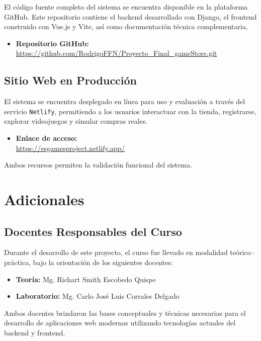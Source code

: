 \documentclass{article}
\begin{document}
El código fuente completo del sistema se encuentra disponible en la plataforma GitHub. Este repositorio contiene el backend desarrollado con Django, el frontend construido con Vue.js y Vite, así como documentación técnica complementaria.

\begin{itemize}
    \item \textbf{Repositorio GitHub:} \\
    \url{https://github.com/RodrigoFFN/Proyecto_Final_gameStore.git}
\end{itemize}

\subsection{Sitio Web en Producción}

El sistema se encuentra desplegado en línea para uso y evaluación a través del servicio \texttt{Netlify}, permitiendo a los usuarios interactuar con la tienda, registrarse, explorar videojuegos y simular compras reales.

\begin{itemize}
    \item \textbf{Enlace de acceso:} \\
    \url{https://esgamesproject.netlify.app/}
\end{itemize}

Ambos recursos permiten la validación funcional del sistema.
\section{Adicionales}

\subsection{Docentes Responsables del Curso}

Durante el desarrollo de este proyecto, el curso fue llevado en modalidad teórico–práctica, bajo la orientación de los siguientes docentes:

\begin{itemize}
    \item \textbf{Teoría:} Mg. Richart Smith Escobedo Quispe
    \item \textbf{Laboratorio:} Mg. Carlo José Luis Corrales Delgado
\end{itemize}

Ambos docentes brindaron las bases conceptuales y técnicas necesarias para el desarrollo de aplicaciones web modernas utilizando tecnologías actuales del backend y frontend.
\end{document}
